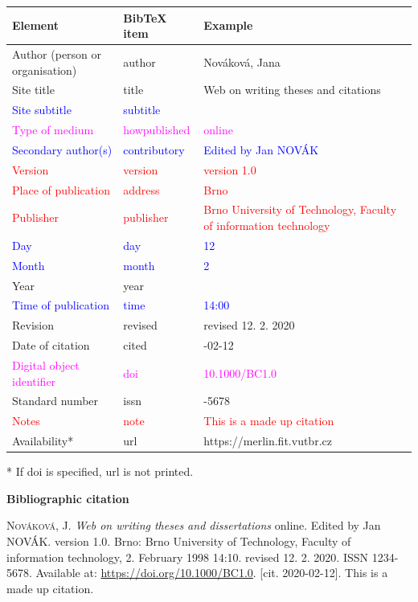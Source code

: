 \begin{tabularx}{0.95\linewidth}{X X >{\raggedright\arraybackslash}X}
    Element & BibTeX item & Example\\\hline
    Author (person or organisation) & author & Nováková, Jana\\
    Site title & title & Web on writing theses and citations\\
    \textcolor{blue}{Site subtitle} &  \textcolor{blue}{subtitle} & \\
    \textcolor{magenta}{Type of medium} & \textcolor{magenta}{howpublished} & \textcolor{magenta}{online}\\
    \textcolor{blue}{Secondary author(s)} & \textcolor{blue}{contributory} & \textcolor{blue}{Edited by Jan NOVÁK}\\
    \textcolor{red}{Version} & \textcolor{red}{version} & \textcolor{red}{version 1.0}\\
    \textcolor{red}{Place of publication} & \textcolor{red}{address} & \textcolor{red}{Brno}\\
    \textcolor{red}{Publisher} & \textcolor{red}{publisher} & \textcolor{red}{Brno University of Technology, Faculty of information technology}\\
    \textcolor{blue}{Day} & \textcolor{blue}{day} & \textcolor{blue}{12}\\
    \textcolor{blue}{Month} & \textcolor{blue}{month} & \textcolor{blue}{2}\\
    Year & year & 2020\\
    \textcolor{blue}{Time of publication} & \textcolor{blue}{time} & \textcolor{blue}{14:00}\\
    Revision & revised & revised 12. 2. 2020\\
    Date of citation & cited & 2020-02-12\\
    \textcolor{magenta}{Digital object identifier} & \textcolor{magenta}{doi} & \textcolor{magenta}{10.1000/BC1.0}\\
    Standard number & issn & 1234-5678\\
    \textcolor{red}{Notes} & \textcolor{red}{note} & \textcolor{red}{This is a made up citation}\\
    Availability* & url & https://merlin.fit.vutbr.cz
\end{tabularx}

\bigskip
*  If doi is specified, url is not printed.

\bigskip

\noindent \textbf{Bibliographic citation}

\medskip

\noindent \textsc{Nováková}, J. \textit{Web on writing theses and dissertations} online. Edited by Jan NOVÁK. version 1.0. Brno: Brno University of Technology, Faculty of information technology, 2. February 1998 14:10. revised 12. 2. 2020. ISSN 1234-5678. Available at: \url{https://doi.org/10.1000/BC1.0}. [cit. 2020-02-12]. This is a made up citation.

%
\fi